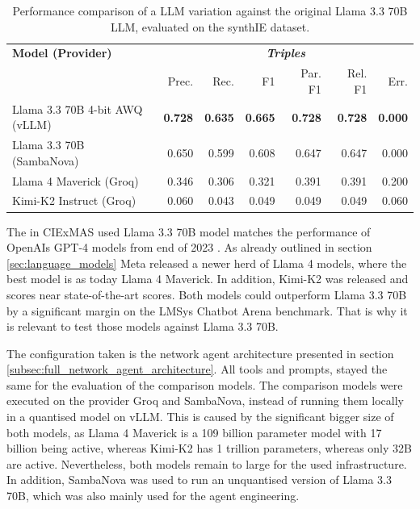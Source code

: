 \documentclass[a4paper,oneside,bibliography=totoc]{scrbook}
\begin{document}
\begin{table}[h]
  \centering
  \begin{tabular}{p{5cm}|rrrrrr}
    \toprule
    \textbf{Model (Provider)}      & \multicolumn{6}{c}{\textit{\textbf{Triples}}}                                                                                      \\
                                   & Prec.                                         & Rec.           & F1             & Par. F1        & Rel. F1        & Err.           \\
    \midrule
    Llama 3.3 70B 4-bit AWQ (vLLM) & \textbf{0.728}                                & \textbf{0.635} & \textbf{0.665} & \textbf{0.728} & \textbf{0.728} & \textbf{0.000} \\
    Llama 3.3 70B (SambaNova)      & 0.650                                         & 0.599          & 0.608          & 0.647          & 0.647          & 0.000          \\
    Llama 4 Maverick (Groq)        & 0.346                                         & 0.306          & 0.321          & 0.391          & 0.391          & 0.200          \\
    Kimi-K2 Instruct (Groq)        & 0.060                                         & 0.043          & 0.049          & 0.049          & 0.049          & 0.060          \\
    \bottomrule
  \end{tabular}
  \caption{Performance comparison of a \ac{LLM} variation against the original Llama 3.3 70B \ac{LLM}, evaluated on the synthIE dataset.}
  \label{tab:model_variation_comparison}
\end{table}

The in CIExMAS used Llama 3.3 70B model matches the performance of OpenAIs GPT-4 models from end of 2023 \cite{Chiang2024}. As already outlined in section \ref{sec:language_models} Meta released a newer herd of Llama 4 models, where the best model is as today Llama 4 Maverick. In addition, Kimi-K2 was released and scores near state-of-the-art scores. Both models could outperform Llama 3.3 70B by a significant margin on the LMSys Chatbot Arena benchmark. That is why it is relevant to test those models against Llama 3.3 70B.

The configuration taken is the network agent architecture presented in section \ref{subsec:full_network_agent_architecture}. All tools and prompts, stayed the same for the evaluation of the comparison models. The comparison models were executed on the provider Groq and SambaNova, instead of running them locally in a quantised model on vLLM. This is caused by the significant bigger size of both models, as Llama 4 Maverick is a 109 billion parameter model with 17 billion being active, whereas Kimi-K2 has 1 trillion parameters, whereas only 32B are active. Nevertheless, both models remain to large for the used infrastructure. In addition, SambaNova was used to run an unquantised version of Llama 3.3 70B, which was also mainly used for the agent engineering.
\end{document}
